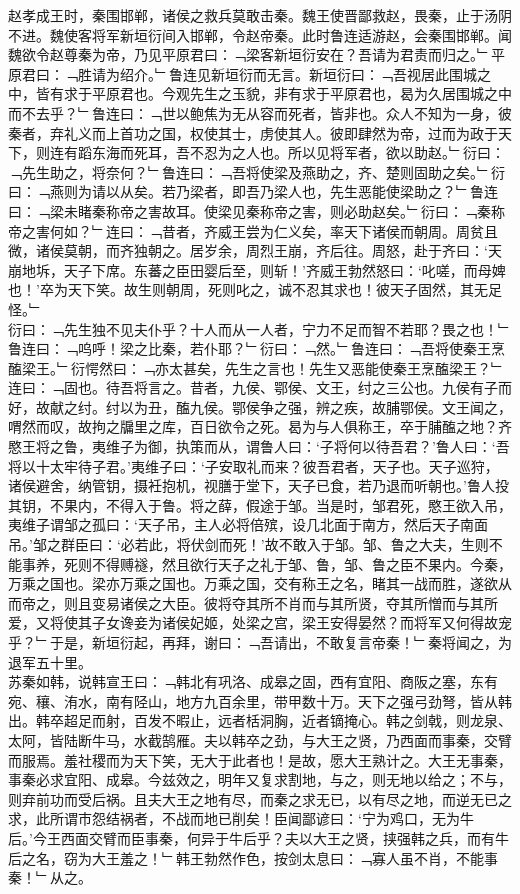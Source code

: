 {{赵孝成王时，秦围邯郸，诸侯之救兵莫敢击秦。魏王使晋鄙救赵，畏秦，止于汤阴不进。魏使客将军新垣衍间入邯郸，令赵帝秦。此时鲁连适游赵，会秦围邯郸。闻魏欲令赵尊秦为帝，乃见平原君曰：﹁梁客新垣衍安在？吾请为君责而归之。﹂平原君曰：﹁胜请为绍介。﹂鲁连见新垣衍而无言。新垣衍曰：﹁吾视居此围城之中，皆有求于平原君也。今观先生之玉貌，非有求于平原君也，曷为久居围城之中而不去乎？﹂鲁连曰：﹁世以鲍焦为无从容而死者，皆非也。众人不知为一身，彼秦者，弃礼义而上首功之国，权使其士，虏使其人。彼即肆然为帝，过而为政于天下，则连有蹈东海而死耳，吾不忍为之人也。所以见将军者，欲以助赵。﹂衍曰：﹁先生助之，将奈何？﹂鲁连曰：﹁吾将使梁及燕助之，齐、楚则固助之矣。﹂衍曰：﹁燕则为请以从矣。若乃梁者，即吾乃梁人也，先生恶能使梁助之？﹂鲁连曰：﹁梁未睹秦称帝之害故耳。使梁见秦称帝之害，则必助赵矣。﹂衍曰：﹁秦称帝之害何如？﹂连曰：﹁昔者，齐威王尝为仁义矣，率天下诸侯而朝周。周贫且微，诸侯莫朝，而齐独朝之。居岁余，周烈王崩，齐后往。周怒，赴于齐曰：‘天崩地坼，天子下席。东蕃之臣田婴后至，则斩！’齐威王勃然怒曰：‘叱嗟，而母婢也！’卒为天下笑。故生则朝周，死则叱之，诚不忍其求也！彼天子固然，其无足怪。﹂\\
衍曰：﹁先生独不见夫仆乎？十人而从一人者，宁力不足而智不若耶？畏之也！﹂鲁连曰：﹁呜呼！梁之比秦，若仆耶？﹂衍曰：﹁然。﹂鲁连曰：﹁吾将使秦王烹醢梁王。﹂衍愕然曰：﹁亦太甚矣，先生之言也！先生又恶能使秦王烹醢梁王？﹂连曰：﹁固也。待吾将言之。昔者，九侯、鄂侯、文王，纣之三公也。九侯有子而好，故献之纣。纣以为丑，醢九侯。鄂侯争之强，辨之疾，故脯鄂侯。文王闻之，喟然而叹，故拘之牖里之库，百日欲令之死。曷为与人俱称王，卒于脯醢之地？齐愍王将之鲁，夷维子为御，执策而从，谓鲁人曰：‘子将何以待吾君？’鲁人曰：‘吾将以十太牢待子君。’夷维子曰：‘子安取礼而来？彼吾君者，天子也。天子巡狩，诸侯避舍，纳管钥，摄衽抱机，视膳于堂下，天子已食，若乃退而听朝也。’鲁人投其钥，不果内，不得入于鲁。将之薛，假途于邹。当是时，邹君死，愍王欲入吊，夷维子谓邹之孤曰：‘天子吊，主人必将倍殡，设几北面于南方，然后天子南面吊。’邹之群臣曰：‘必若此，将伏剑而死！’故不敢入于邹。邹、鲁之大夫，生则不能事养，死则不得赙襚，然且欲行天子之礼于邹、鲁，邹、鲁之臣不果内。今秦，万乘之国也。梁亦万乘之国也。万乘之国，交有称王之名，睹其一战而胜，遂欲从而帝之，则且变易诸侯之大臣。彼将夺其所不肖而与其所贤，夺其所憎而与其所爱，又将使其子女谗妾为诸侯妃姬，处梁之宫，梁王安得晏然？而将军又何得故宠乎？﹂于是，新垣衍起，再拜，谢曰：﹁吾请出，不敢复言帝秦！﹂秦将闻之，为退军五十里。}\\
苏秦如韩，说韩宣王曰：﹁韩北有巩洛、成皋之固，西有宜阳、商阪之塞，东有宛、穰、洧水，南有陉山，地方九百余里，带甲数十万。天下之强弓劲弩，皆从韩出。韩卒超足而射，百发不暇止，远者栝洞胸，近者镝掩心。韩之剑戟，则龙泉、太阿，皆陆断牛马，水截鹄雁。夫以韩卒之劲，与大王之贤，乃西面而事秦，交臂而服焉。羞社稷而为天下笑，无大于此者也！是故，愿大王熟计之。大王无事秦，事秦必求宜阳、成皋。今兹效之，明年又复求割地，与之，则无地以给之；不与，则弃前功而受后祸。且夫大王之地有尽，而秦之求无已，以有尽之地，而逆无已之求，此所谓市怨结祸者，不战而地已削矣！臣闻鄙谚曰：‘宁为鸡口，无为牛后。’今王西面交臂而臣事秦，何异于牛后乎？夫以大王之贤，挟强韩之兵，而有牛后之名，窃为大王羞之！﹂韩王勃然作色，按剑太息曰：﹁寡人虽不肖，不能事秦！﹂从之。
}
